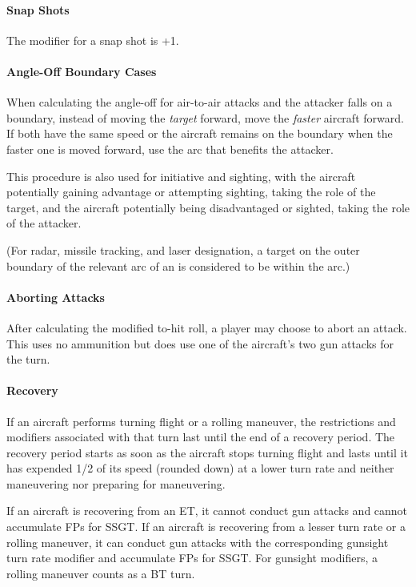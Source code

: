 \documentclass[10pt]{article}
\begin{document}
\paragraph{Snap Shots} The modifier for a snap shot is +1.

\paragraph{Angle-Off Boundary Cases} When calculating the angle-off for air-to-air attacks and the attacker falls on a boundary, instead of moving the \emph{target} forward, move the \emph{faster} aircraft forward. If both have the same speed or the aircraft remains on the boundary when the faster one is moved forward, use the arc that benefits the attacker. 

This procedure is also used for initiative and sighting, with the aircraft potentially gaining advantage or attempting sighting, taking the role of the target, and the aircraft potentially being disadvantaged or sighted, taking the role of the attacker.

(For radar, missile tracking, and laser designation, a target on the outer boundary of the relevant arc of an is considered to be within the arc.)

\paragraph{Aborting Attacks} After calculating the modified to-hit roll, a player may choose to abort an attack. This uses no ammunition but does use one of the aircraft's two gun attacks for the turn.

\paragraph{Recovery} If an aircraft performs turning flight or a rolling maneuver, the restrictions and modifiers associated with that turn last until the end of a recovery period. The recovery period starts as soon as the aircraft stops turning flight and lasts until it has expended 1/2 of its speed (rounded down) at a lower turn rate and neither maneuvering nor preparing for maneuvering. 

If an aircraft is recovering from an ET, it cannot conduct gun attacks and cannot accumulate FPs for SSGT. If an aircraft is recovering from a lesser turn rate or a rolling maneuver, it can conduct gun attacks with the corresponding gunsight turn rate modifier and accumulate FPs for SSGT. For gunsight modifiers, a rolling maneuver counts as a BT turn.
\end{document}
